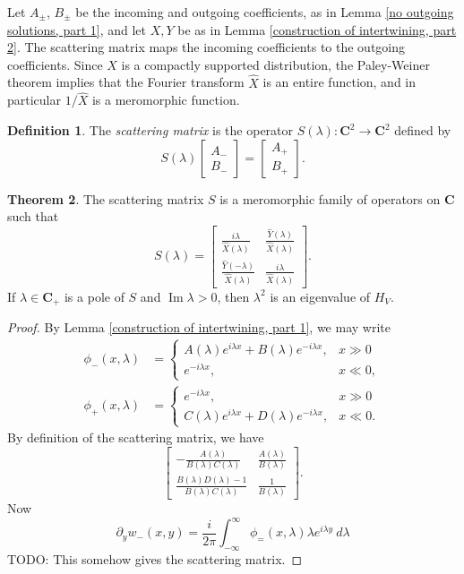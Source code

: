 \documentclass[12pt]{report}
\newcommand{\CC}{\mathbf{C}}
\newcommand{\dfn}[1]{\emph{#1}\index{#1}}
\renewcommand{\Im}{\operatorname{Im}}
\theoremstyle{definition}
\newtheorem{theorem}{Theorem}[chapter]
\newtheorem{definition}[theorem]{Definition}
\begin{document}
Let $A_\pm$, $B_\pm$ be the incoming and outgoing coefficients, as in Lemma \ref{no outgoing solutions, part 1}, and let $X, Y$ be as in Lemma \ref{construction of intertwining, part 2}. The scattering matrix maps the incoming coefficients to the outgoing coefficients. Since $X$ is a compactly supported distribution, the Paley-Weiner theorem implies that the Fourier transform $\hat X$ is an entire function, and in particular $1/\hat X$ is a meromorphic function.
\begin{definition}
The \dfn{scattering matrix} is the operator $S(\lambda): \CC^2 \to \CC^2$ defined by
$$S(\lambda)\begin{bmatrix}A_-\\B_-\end{bmatrix} = \begin{bmatrix}A_+\\B_+\end{bmatrix}.$$
\end{definition}
\begin{theorem}
  The scattering matrix $S$ is a meromorphic family of operators on $\CC$ such that
  $$S(\lambda) = \begin{bmatrix}\frac{i\lambda}{\hat X(\lambda)} & \frac{\hat Y(\lambda)}{\hat X(\lambda)}\\ \frac{\hat Y(-\lambda)}{\hat X(\lambda)} & \frac{i\lambda}{\hat X(\lambda)}\end{bmatrix}.$$
  If $\lambda \in \CC_+$ is a pole of $S$ and $\Im \lambda > 0$, then $\lambda^2$ is an eigenvalue of $H_V$.
\end{theorem}
\begin{proof}
  By Lemma \ref{construction of intertwining, part 1}, we may write
\begin{align*}
  \phi_-(x, \lambda) &= \begin{cases}
  A(\lambda)e^{i\lambda x} + B(\lambda)e^{-i\lambda x}, &x \gg 0\\
  e^{-i\lambda x}, &x \ll 0,
\end{cases}\\
  \phi_+(x, \lambda) &= \begin{cases}
  e^{-i\lambda x}, &x \gg 0\\
  C(\lambda) e^{i\lambda x} + D(\lambda)e^{-i\lambda x}, &x \ll 0.
\end{cases}
\end{align*}
  By definition of the scattering matrix, we have
  $$\begin{bmatrix}
  -\frac{A(\lambda)}{B(\lambda)C(\lambda)} &\frac{A(\lambda)}{B(\lambda)}\\
  \frac{B(\lambda)D(\lambda) - 1}{B(\lambda)C(\lambda)} & \frac{1}{B(\lambda)}
  \end{bmatrix}.$$
  Now
  $$\partial_yw_-(x, y) = \frac{i}{2\pi} \int_{-\infty}^\infty \phi_=(x, \lambda) \lambda e^{i\lambda y} ~d\lambda$$
  TODO: This somehow gives the scattering matrix.
\end{proof}
\end{document}
